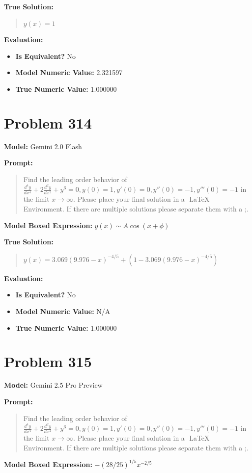 \documentclass{article}
\begin{document}
{\textbf{True Solution:}
\begin{quote}
$y(x)=1$
\end{quote}

\textbf{Evaluation:}
\begin{itemize}
\item \textbf{Is Equivalent?} No
\item \textbf{Model Numeric Value:} 2.321597
\item \textbf{True Numeric Value:} 1.000000
\end{itemize}
\vspace{1cm}
\section*{Problem 314}
\textbf{Model:} Gemini 2.0 Flash

\textbf{Prompt:}
\begin{quote}
Find the leading order behavior of $\frac{d^4y}{dx^4} + 2\frac{d^2y}{dx^2} + y^6 = 0, y(0)=1,y'(0)=0,y''(0)=-1,y'''(0)=-1$ in the limit $x \to \infty$. Please place your final solution in a $\boxed{}$ LaTeX Environment. If there are multiple solutions please separate them with a ;.
\end{quote}
\textbf{Model Boxed Expression:} $y(x) \sim A\cos(x + \phi)$

\textbf{True Solution:}
\begin{quote}
$y(x) = 3.069(9.976 - x)^{-4/5} + (1 - 3.069(9.976 - x)^{-4/5})$
\end{quote}

\textbf{Evaluation:}
\begin{itemize}
\item \textbf{Is Equivalent?} No
\item \textbf{Model Numeric Value:} N/A
\item \textbf{True Numeric Value:} 1.000000
\end{itemize}
\vspace{1cm}
\section*{Problem 315}
\textbf{Model:} Gemini 2.5 Pro Preview

\textbf{Prompt:}
\begin{quote}
Find the leading order behavior of $\frac{d^4y}{dx^4} + 2\frac{d^2y}{dx^2} + y^6 = 0, y(0)=1,y'(0)=0,y''(0)=-1,y'''(0)=-1$ in the limit $x \to \infty$. Please place your final solution in a $\boxed{}$ LaTeX Environment. If there are multiple solutions please separate them with a ;.
\end{quote}
\textbf{Model Boxed Expression:} $-(28/25)^{1/5}x^{-2/5}$

}
\end{document}
